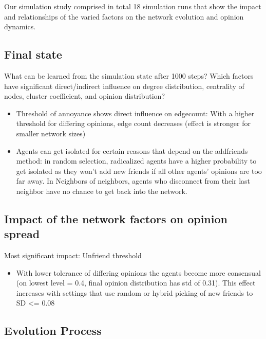 \documentclass[runningheads]{llncs}
\providecommand{\tightlist}{%
  \setlength{\itemsep}{0pt}\setlength{\parskip}{0pt}}
\begin{document}
Our simulation study comprised in total 18 simulation runs that show the
impact and relationships of the varied factors on the network evolution
and opinion dynamics.

\hypertarget{final-state}{%
\subsection{Final state}\label{final-state}}

What can be learned from the simulation state after 1000 steps? Which
factors have significant direct/indirect influence on degree
distribution, centrality of nodes, cluster coefficient, and opinion
distribution?

\begin{itemize}
\tightlist
\item
  Threshold of annoyance shows direct influence on edgecount: With a
  higher threshold for differing opinions, edge count decreases (effect
  is stronger for smaller network sizes)
\item
  Agents can get isolated for certain reasons that depend on the
  addfriends method: in random selection, radicalized agents have a
  higher probability to get isolated as they won't add new friends if
  all other agents' opinions are too far away. In Neighbors of
  neighbors, agents who disconnect from their last neighbor have no
  chance to get back into the network.
\end{itemize}

\hypertarget{impact-of-the-network-factors-on-opinion-spread}{%
\subsection{Impact of the network factors on opinion
spread}\label{impact-of-the-network-factors-on-opinion-spread}}

Most significant impact: Unfriend threshold

\begin{itemize}
\tightlist
\item
  With lower tolerance of differing opinions the agents become more
  consensual (on lowest level = 0.4, final opinion distribution has std
  of 0.31). This effect increases with settings that use random or
  hybrid picking of new friends to SD \textless= 0.08
\end{itemize}

\hypertarget{evolution-process}{%
\subsection{Evolution Process}\label{evolution-process}}
\end{document}
